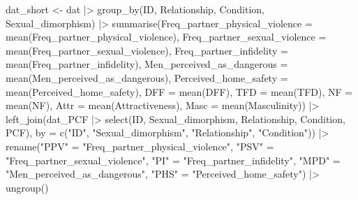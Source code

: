 \documentclass[
  bookmarksnumbered]{article}
\newenvironment{Shaded}{\begin{snugshade}}{\end{snugshade}}
\newcommand{\AttributeTok}[1]{\textcolor[rgb]{0.80,0.80,0.80}{#1}}
\newcommand{\FunctionTok}[1]{\textcolor[rgb]{0.94,0.94,0.56}{#1}}
\newcommand{\NormalTok}[1]{\textcolor[rgb]{0.80,0.80,0.80}{#1}}
\newcommand{\OtherTok}[1]{\textcolor[rgb]{0.94,0.94,0.56}{#1}}
\newcommand{\SpecialCharTok}[1]{\textcolor[rgb]{0.86,0.64,0.64}{#1}}
\newcommand{\StringTok}[1]{\textcolor[rgb]{0.80,0.58,0.58}{#1}}
\begin{document}
\begin{Shaded}
\begin{Highlighting}[]
\NormalTok{dat\_short }\OtherTok{\textless{}{-}}\NormalTok{ dat }\SpecialCharTok{|\textgreater{}} 
  \FunctionTok{group\_by}\NormalTok{(ID, Relationship, Condition, Sexual\_dimorphism) }\SpecialCharTok{|\textgreater{}} 
  \FunctionTok{summarise}\NormalTok{(}\AttributeTok{Freq\_partner\_physical\_violence =} \FunctionTok{mean}\NormalTok{(Freq\_partner\_physical\_violence),}
            \AttributeTok{Freq\_partner\_sexual\_violence =} \FunctionTok{mean}\NormalTok{(Freq\_partner\_sexual\_violence), }
            \AttributeTok{Freq\_partner\_infidelity =} \FunctionTok{mean}\NormalTok{(Freq\_partner\_infidelity),}
            \AttributeTok{Men\_perceived\_as\_dangerous =} \FunctionTok{mean}\NormalTok{(Men\_perceived\_as\_dangerous),}
            \AttributeTok{Perceived\_home\_safety =} \FunctionTok{mean}\NormalTok{(Perceived\_home\_safety),}
            \AttributeTok{DFF =} \FunctionTok{mean}\NormalTok{(DFF),}
            \AttributeTok{TFD =} \FunctionTok{mean}\NormalTok{(TFD),}
            \AttributeTok{NF =} \FunctionTok{mean}\NormalTok{(NF),}
            \AttributeTok{Attr =} \FunctionTok{mean}\NormalTok{(Attractiveness),}
            \AttributeTok{Masc =} \FunctionTok{mean}\NormalTok{(Masculinity)) }\SpecialCharTok{|\textgreater{}} 
  \FunctionTok{left\_join}\NormalTok{(dat\_PCF }\SpecialCharTok{|\textgreater{}} 
              \FunctionTok{select}\NormalTok{(ID, Sexual\_dimorphism, Relationship, Condition, PCF), }
            \AttributeTok{by =} \FunctionTok{c}\NormalTok{(}\StringTok{"ID"}\NormalTok{, }\StringTok{"Sexual\_dimorphism"}\NormalTok{, }\StringTok{"Relationship"}\NormalTok{, }\StringTok{"Condition"}\NormalTok{)) }\SpecialCharTok{|\textgreater{}} 
  \FunctionTok{rename}\NormalTok{(}\StringTok{"PPV"} \OtherTok{=} \StringTok{"Freq\_partner\_physical\_violence"}\NormalTok{,}
         \StringTok{"PSV"} \OtherTok{=} \StringTok{"Freq\_partner\_sexual\_violence"}\NormalTok{,      }
         \StringTok{"PI"} \OtherTok{=}  \StringTok{"Freq\_partner\_infidelity"}\NormalTok{,}
         \StringTok{"MPD"} \OtherTok{=} \StringTok{"Men\_perceived\_as\_dangerous"}\NormalTok{,}
         \StringTok{"PHS"} \OtherTok{=} \StringTok{"Perceived\_home\_safety"}\NormalTok{) }\SpecialCharTok{|\textgreater{}} 
  \FunctionTok{ungroup}\NormalTok{()}
 

\end{Highlighting}
\end{Shaded}
\end{document}
